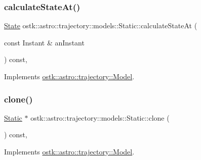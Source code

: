 \subsubsection{\texorpdfstring{calculate\+State\+At()}{calculateStateAt()}}
{\footnotesize\ttfamily \hyperlink{classostk_1_1astro_1_1trajectory_1_1_state}{State} ostk\+::astro\+::trajectory\+::models\+::\+Static\+::calculate\+State\+At (\begin{DoxyParamCaption}\item[{const Instant \&}]{an\+Instant }\end{DoxyParamCaption}) const\hspace{0.3cm}{\ttfamily [override]}, {\ttfamily [virtual]}}



Implements \hyperlink{classostk_1_1astro_1_1trajectory_1_1_model_ad25eeaded2946bf73d44161b5f4e9a0e}{ostk\+::astro\+::trajectory\+::\+Model}.

\mbox{\label{classostk_1_1astro_1_1trajectory_1_1models_1_1_static_abe3edbc72ae2f4fbd6c2593e2aa08755}} 
\subsubsection{\texorpdfstring{clone()}{clone()}}
{\footnotesize\ttfamily \hyperlink{classostk_1_1astro_1_1trajectory_1_1models_1_1_static}{Static} $\ast$ ostk\+::astro\+::trajectory\+::models\+::\+Static\+::clone (\begin{DoxyParamCaption}{ }\end{DoxyParamCaption}) const\hspace{0.3cm}{\ttfamily [override]}, {\ttfamily [virtual]}}



Implements \hyperlink{classostk_1_1astro_1_1trajectory_1_1_model_ad9f1467f711b07796ddc1437fb9ad9df}{ostk\+::astro\+::trajectory\+::\+Model}.

\mbox{\label{classostk_1_1astro_1_1trajectory_1_1models_1_1_static_a5a80d75c9215af9b198c9f8653c5bc17}} 
